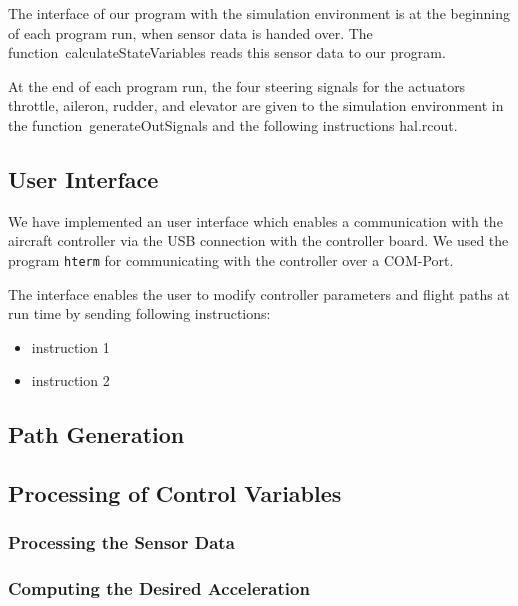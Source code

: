 \documentclass[11pt,a4paper]{scrartcl}		%
\begin{document}
The interface of our program with the simulation environment is at the beginning of each program run, when sensor data is handed over.
The function~\textsf{calculateStateVariables} reads this sensor data  to our program.

At the end of each program run, the four steering signals for the actuators throttle, aileron, rudder, and elevator are given to the simulation environment in the function~\textsf{generateOutSignals} and the following instructions \textsf{hal.rcout}.

\medskip




\subsection{User Interface}

We have implemented an user interface which enables a communication with the aircraft controller via the USB connection with the controller board. 
We used the program \texttt{hterm} for communicating with the controller over a COM-Port.

The interface enables the user to modify controller parameters and flight paths at run time by sending following instructions:
\begin{itemize}
\item 
instruction 1
\item
instruction 2
\end{itemize}

\medskip




\subsection{Path Generation}



\medskip





\subsection{Processing of Control Variables}

\subsubsection*{Processing the Sensor Data}

\subsubsection*{Computing the Desired Acceleration}
\end{document}
